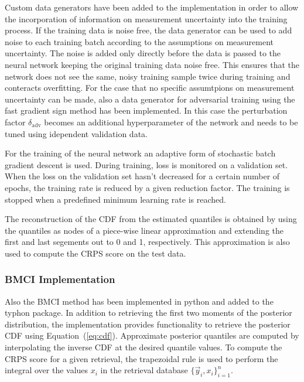 \documentclass[journal abbreviation, manuscript]{copernicus}
\begin{document}
  Custom data generators have been added to the implementation in order to allow
  the incorporation of information on measurement uncertainty into the training
  process. If the training data is noise free, the data generator can be used to
  add noise to each training batch according to the assumptions on measurement
  uncertainty. The noise is added only directly before the data is passed to the
  neural network keeping the original training data noise free. This ensures
  that the network does not see the same, noisy training sample twice during
  training and conteracts overfitting. For the case that no specific assumtpions
  on measurement uncertainty can be made, also a data generator for adversarial
  training using the fast gradient sign method has been implemented. In this
  case the perturbation factor $\delta_{\text{adv}}$ becomes an additional
  hyperparameter of the network and needs to be tuned using idependent
  validation data.

  For the training of the neural network an adaptive form of stochastic batch
  gradient descent is used. During training, loss is monitored on a validation
  set. When the loss on the validation set hasn't decreased for a certain number
  of epochs, the training rate is reduced by a given reduction factor. The
  training is stopped when a predefined minimum learning rate is reached.

  The reconstruction of the CDF from the estimated quantiles is obtained
  by using the quantiles as nodes of a piece-wise linear approximation and
  extending the first and last segements out to 0 and 1, respectively.
  This approximation is also used to compute the CRPS score on the test
  data.


\subsubsection{BMCI Implementation}

 Also the BMCI method has been implemented in python and added to the
 typhon package. In addition to retrieving the first two moments of the
 posterior distribution, the implementation provides functionality to
 retrieve the posterior CDF using Equation~(\ref{eq:cdf}). Approximate posterior
 quantiles are computed by interpolating the inverse CDF at the desired quantile
 values. To compute the CRPS score for a given retrieval, the trapezoidal rule
 is used to perform the integral over the values $x_i$ in the retrieval database
 $\{\vec{y}_i, x_i\}_{i = 1}^n$.
\end{document}
